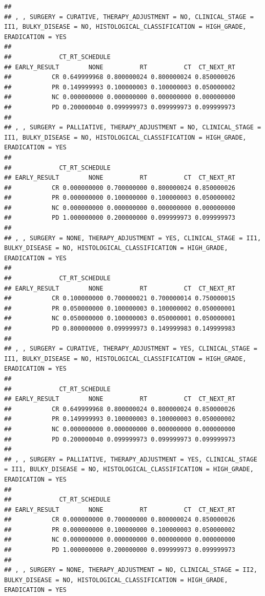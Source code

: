 \documentclass[]{article}
\begin{document}
\begin{verbatim}
## 
## , , SURGERY = CURATIVE, THERAPY_ADJUSTMENT = NO, CLINICAL_STAGE = II1, BULKY_DISEASE = NO, HISTOLOGICAL_CLASSIFICATION = HIGH_GRADE, ERADICATION = YES
## 
##             CT_RT_SCHEDULE
## EARLY_RESULT        NONE          RT          CT  CT_NEXT_RT
##           CR 0.649999968 0.800000024 0.800000024 0.850000026
##           PR 0.149999993 0.100000003 0.100000003 0.050000002
##           NC 0.000000000 0.000000000 0.000000000 0.000000000
##           PD 0.200000040 0.099999973 0.099999973 0.099999973
## 
## , , SURGERY = PALLIATIVE, THERAPY_ADJUSTMENT = NO, CLINICAL_STAGE = II1, BULKY_DISEASE = NO, HISTOLOGICAL_CLASSIFICATION = HIGH_GRADE, ERADICATION = YES
## 
##             CT_RT_SCHEDULE
## EARLY_RESULT        NONE          RT          CT  CT_NEXT_RT
##           CR 0.000000000 0.700000000 0.800000024 0.850000026
##           PR 0.000000000 0.100000000 0.100000003 0.050000002
##           NC 0.000000000 0.000000000 0.000000000 0.000000000
##           PD 1.000000000 0.200000000 0.099999973 0.099999973
## 
## , , SURGERY = NONE, THERAPY_ADJUSTMENT = YES, CLINICAL_STAGE = II1, BULKY_DISEASE = NO, HISTOLOGICAL_CLASSIFICATION = HIGH_GRADE, ERADICATION = YES
## 
##             CT_RT_SCHEDULE
## EARLY_RESULT        NONE          RT          CT  CT_NEXT_RT
##           CR 0.100000000 0.700000021 0.700000014 0.750000015
##           PR 0.050000000 0.100000003 0.100000002 0.050000001
##           NC 0.050000000 0.100000003 0.050000001 0.050000001
##           PD 0.800000000 0.099999973 0.149999983 0.149999983
## 
## , , SURGERY = CURATIVE, THERAPY_ADJUSTMENT = YES, CLINICAL_STAGE = II1, BULKY_DISEASE = NO, HISTOLOGICAL_CLASSIFICATION = HIGH_GRADE, ERADICATION = YES
## 
##             CT_RT_SCHEDULE
## EARLY_RESULT        NONE          RT          CT  CT_NEXT_RT
##           CR 0.649999968 0.800000024 0.800000024 0.850000026
##           PR 0.149999993 0.100000003 0.100000003 0.050000002
##           NC 0.000000000 0.000000000 0.000000000 0.000000000
##           PD 0.200000040 0.099999973 0.099999973 0.099999973
## 
## , , SURGERY = PALLIATIVE, THERAPY_ADJUSTMENT = YES, CLINICAL_STAGE = II1, BULKY_DISEASE = NO, HISTOLOGICAL_CLASSIFICATION = HIGH_GRADE, ERADICATION = YES
## 
##             CT_RT_SCHEDULE
## EARLY_RESULT        NONE          RT          CT  CT_NEXT_RT
##           CR 0.000000000 0.700000000 0.800000024 0.850000026
##           PR 0.000000000 0.100000000 0.100000003 0.050000002
##           NC 0.000000000 0.000000000 0.000000000 0.000000000
##           PD 1.000000000 0.200000000 0.099999973 0.099999973
## 
## , , SURGERY = NONE, THERAPY_ADJUSTMENT = NO, CLINICAL_STAGE = II2, BULKY_DISEASE = NO, HISTOLOGICAL_CLASSIFICATION = HIGH_GRADE, ERADICATION = YES

\end{verbatim}
\end{document}
